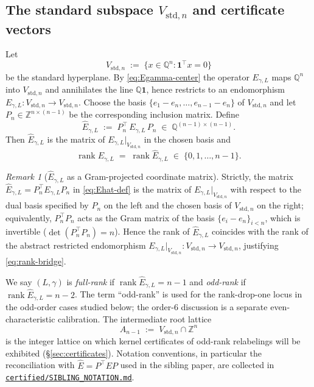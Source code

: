 \documentclass[11pt,a4paper]{article}
\theoremstyle{definition}
\theoremstyle{remark}
\newtheorem{remark}[theorem]{Remark}
\providecommand{\one}{\mathbf{1}}
\providecommand{\Z}{\mathbb{Z}}
\providecommand{\Q}{\mathbb{Q}}
\providecommand{\rank}{\operatorname{rank}}
\newcommand{\Vstdn}{V_{\mathrm{std},n}}
\newcommand{\Egamma}{E_{\gamma,L}}
\newcommand{\Ehat}{\widehat{E}_{\gamma,L}}
\begin{document}
\subsection{\texorpdfstring{The standard subspace $\Vstdn$ and certificate vectors}{The standard subspace and certificate vectors}}
\label{sec:setup-Vstd}

Let
\begin{equation}\label{eq:Vstd-def}
   \Vstdn \;:=\; \bigl\{ x \in \Q^n : \one^{\!\top} x = 0 \bigr\}
\end{equation}
be the standard hyperplane. By \eqref{eq:Egamma-center} the operator
$\Egamma$ maps $\Q^n$ into $\Vstdn$ and annihilates the line $\Q\one$,
hence restricts to an endomorphism $\Egamma : \Vstdn \to \Vstdn$.
Choose the basis $\{e_1 - e_n, \dots, e_{n-1} - e_n\}$ of $\Vstdn$ and
let $P_n \in \Z^{n \times (n-1)}$ be the corresponding inclusion matrix.
Define
\begin{equation}\label{eq:Ehat-def}
   \Ehat \;:=\; P_n^{\!\top} \, \Egamma \, P_n
   \;\in\; \Q^{(n-1) \times (n-1)}.
\end{equation}
Then $\Ehat$ is the matrix of $\Egamma|_{\Vstdn}$ in the chosen basis
and
\begin{equation}\label{eq:rank-bridge}
   \rank \Egamma \;=\; \rank \Ehat
   \;\in\; \{0, 1, \dots, n-1\}.
\end{equation}

\begin{remark}[$\Ehat$ as a Gram-projected coordinate matrix]
\label{rem:Ehat-gram}
Strictly, the matrix $\Ehat = P_n^\top \Egamma P_n$ in
\eqref{eq:Ehat-def} is the matrix of $\Egamma|_{\Vstdn}$ with respect
to the dual basis specified by $P_n$ on the left and the chosen basis
of $\Vstdn$ on the right; equivalently, $P_n^\top P_n$ acts as the
Gram matrix of the basis $\{e_i - e_n\}_{i < n}$, which is invertible
($\det(P_n^\top P_n) = n$). Hence the rank of $\Ehat$ coincides with
the rank of the abstract restricted endomorphism
$\Egamma|_{\Vstdn} : \Vstdn \to \Vstdn$, justifying
\eqref{eq:rank-bridge}.
\end{remark}

We say $(L, \gamma)$ is \emph{full-rank} if $\rank \Ehat = n - 1$ and
\emph{odd-rank} if $\rank \Ehat = n - 2$. The term ``odd-rank'' is
used for the rank-drop-one locus in the odd-order cases studied below;
the order-$6$ discussion is a separate even-characteristic calibration.
The intermediate root
lattice
\begin{equation}\label{eq:Aroot-def}
   A_{n-1} \;:=\; \Vstdn \cap \Z^n
\end{equation}
is the integer lattice on which kernel certificates of odd-rank
relabelings will be exhibited (\S\ref{sec:certificates}). Notation
conventions, in particular the reconciliation with
$\widehat{E} = P^{\!\top} E P$ used in the sibling paper, are
collected in
\href{../certified/SIBLING_NOTATION.md}{\texttt{certified/SIBLING\_NOTATION.md}}.
\end{document}

